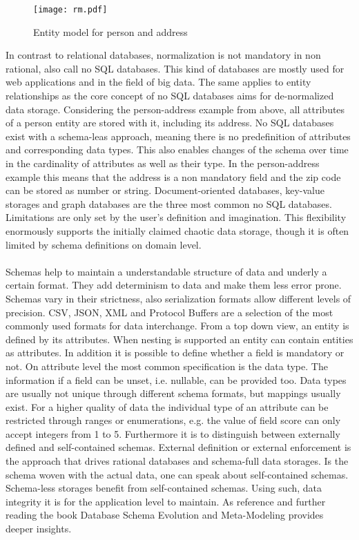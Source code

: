 \begin{figure}[htb]
  \centering
  \texttt{[image: rm.pdf]}\\
  \caption{Entity model for person and address}\label{fig:rm}
\end{figure}

In contrast to relational databases, normalization is not mandatory in non rational, also call no SQL databases. This kind of databases are mostly used for web applications and in the field of big data. The same applies to entity relationships as the core concept of no SQL databases aims for de-normalized data storage. Considering the person-address example from above, all attributes of a person entity are stored with it, including its address. No SQL databases exist with a schema-leas approach, meaning there is no predefinition of attributes and corresponding data types. This also enables changes of the schema over time in the cardinality of attributes as well as their type. In the person-address example this means that the address is a non mandatory field and the zip code can be stored as number or string. Document-oriented databases, key-value storages and graph databases are the three most common no SQL databases.  Limitations are only set by the user's definition and imagination. This flexibility enormously supports the initially claimed chaotic data storage, though it is often limited by schema definitions on domain level. 
\\\\
Schemas help to maintain a understandable structure of data and underly a certain format. They add determinism to data and make them less error prone. Schemas vary in their strictness, also serialization formats allow different levels of precision. CSV, JSON, XML and Protocol Buffers are a selection of the most commonly used formats for data interchange. From a top down view, an entity is defined by its attributes. When nesting is supported an entity can contain entities as attributes. In addition it is possible to define whether a field is mandatory or not. On attribute level the most common specification is the data type. The information if a field can be unset, i.e. nullable, can be provided too. Data types are usually not unique through different schema formats, but mappings usually exist. For a higher quality of data the individual type of an attribute can be restricted through ranges or enumerations, e.g. the value of field score can only accept integers from 1 to 5. Furthermore it is to distinguish between externally defined and self-contained schemas. External definition or external enforcement is the approach that drives rational databases and schema-full data storages. Is the schema woven with the actual data, one can speak about self-contained schemas. Schema-less storages benefit from self-contained schemas. Using such, data integrity it is for the application level to maintain. As reference and further reading the book Database Schema Evolution and Meta-Modeling\cite{balsters_brock_conrad_2006} provides deeper insights.
